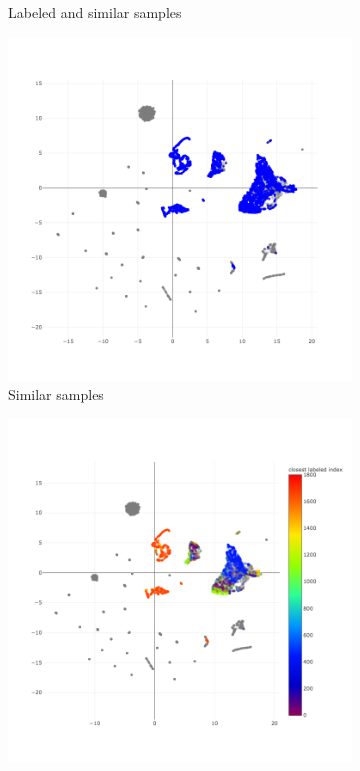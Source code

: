\documentclass{article}
\begin{document}
\begin{figure}
\begin{subfigure}{.32\textwidth}
        \caption{Labeled and similar samples}
        \label{fig:alg-similar-labeled}
    \end{subfigure}
    \begin{subfigure}{.32\textwidth}
        \centering
        \includegraphics[width=\linewidth]{img/embedding_similar.png}
        \caption{Similar samples}
        \label{fig:alg-similar}
    \end{subfigure}
    \begin{subfigure}{.32\textwidth}
        \centering
        \includegraphics[width=\linewidth]{img/embedding_index.png}

\end{subfigure}
\end{figure}
\end{document}
